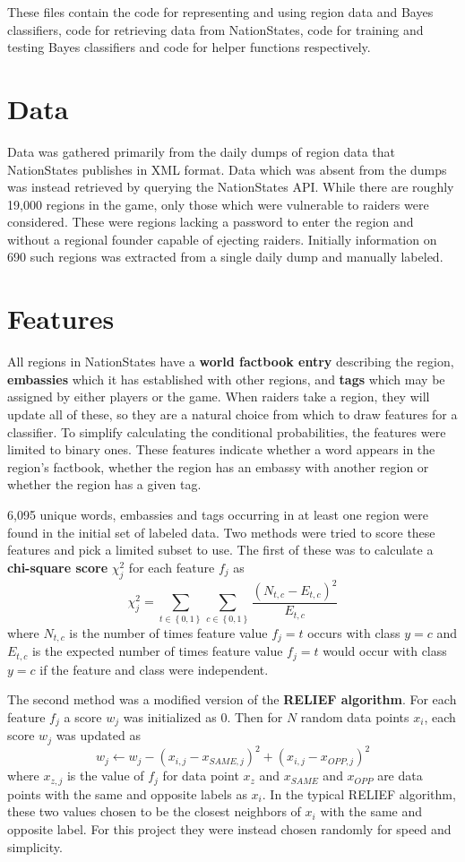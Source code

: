\documentclass[12pt]{article}
\begin{document}
\noindent These files contain the code for representing and using region data and Bayes classifiers, code for retrieving data from NationStates, code for training and testing Bayes classifiers and code for helper functions respectively.

\section{Data}
Data was gathered primarily from the daily dumps of region data that NationStates publishes in XML format. Data which was absent from the dumps was instead retrieved by querying the NationStates API. While there are roughly 19,000 regions in the game, only those which were vulnerable to raiders were considered. These were regions lacking a password to enter the region and without a regional founder capable of ejecting raiders. Initially information on 690 such regions was extracted from a single daily dump and manually labeled.

\section{Features}
All regions in NationStates have a \textbf{world factbook entry} describing the region, \textbf{embassies} which it has established with other regions, and \textbf{tags} which may be assigned by either players or the game. When raiders take a region, they will update all of these, so they are a natural choice from which to draw features for a classifier. To simplify calculating the conditional probabilities, the features were limited to binary ones. These features indicate whether a word appears in the region's factbook, whether the region has an embassy with another region or whether the region has a given tag.

6,095 unique words, embassies and tags occurring in at least one region were found in the initial set of labeled data. Two methods were tried to score these features and pick a limited subset to use. The first of these was to calculate a \textbf{chi-square score} $\chi^2_j$ for each feature $f_j$ as
\[
	\chi^2_j=\sum_{t\in\left\{0,1\right\}}\sum_{c\in\left\{0,1\right\}}\frac{\left(N_{t,c}-E_{t,c}\right)^2}{E_{t,c}}
\]
\noindent where $N_{t,c}$ is the number of times feature value $f_j=t$ occurs with class $y=c$ and $E_{t,c}$ is the expected number of times feature value $f_j=t$ would occur with class $y=c$ if the feature and class were independent.

The second method was a  modified version of the \textbf{RELIEF algorithm}. For each feature $f_j$ a score $w_j$ was initialized as $0$. Then for $N$ random data points $x_i$, each score $w_j$ was updated as
\[
	w_j\leftarrow w_j-(x_{i,j} - x_{SAME,j})^2 + (x_{i,j} - x_{OPP,j})^2
\]
\noindent where $x_{z,j}$ is the value of $f_j$ for data point $x_z$ and $x_{SAME}$ and $x_{OPP}$ are data points with the same and opposite labels as $x_i$. In the typical RELIEF algorithm, these two values chosen to be the closest neighbors of $x_i$ with the same and opposite label. For this project they were instead chosen randomly for speed and simplicity.
\end{document}
